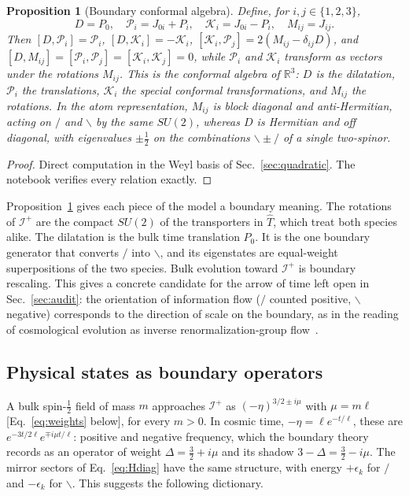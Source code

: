 \documentclass[reprint,aps,prd,amsmath,amssymb,superscriptaddress,nofootinbib,floatfix]{revtex4-2}
\theoremstyle{plain}
\newtheorem{proposition}{Proposition}
\theoremstyle{definition}
\theoremstyle{remark}
\newcommand{\Lat}{\ensuremath{/}}                 %
\newcommand{\Rat}{\ensuremath{\backslash}}        %
\newcommand{\Tc}{\hat{T}}
\newcommand{\SU}{SU(2)}
\begin{document}
\begin{proposition}[Boundary conformal algebra]
\label{prop:conformal}
Define, for $i,j\in\{1,2,3\}$,
\begin{equation}
D=P_0,\quad \mathcal{P}_i=J_{0i}+P_i,\quad \mathcal{K}_i=J_{0i}-P_i,\quad M_{ij}=J_{ij}.
\label{eq:confgen}
\end{equation}
Then $[D,\mathcal{P}_i]=\mathcal{P}_i$, $[D,\mathcal{K}_i]=-\mathcal{K}_i$, $[\mathcal{K}_i,\mathcal{P}_j]=2(M_{ij}-\delta_{ij}D)$, and
$[D,M_{ij}]=[\mathcal{P}_i,\mathcal{P}_j]=[\mathcal{K}_i,\mathcal{K}_j]=0$, while $\mathcal{P}_i$ and $\mathcal{K}_i$ transform as vectors under the
rotations $M_{ij}$. This is the conformal algebra of $\mathbb{R}^3$: $D$ is the dilatation, $\mathcal{P}_i$ the translations,
$\mathcal{K}_i$ the special conformal transformations, and $M_{ij}$ the rotations. In the atom representation, $M_{ij}$ is block
diagonal and anti-Hermitian, acting on $\Lat$ and $\Rat$ by the same $\SU$, whereas $D$ is Hermitian and off diagonal,
with eigenvalues $\pm\tfrac12$ on the combinations $\Rat\pm\Lat$ of a single two-spinor.
\end{proposition}
\begin{proof}
Direct computation in the Weyl basis of Sec.~\ref{sec:quadratic}. The notebook verifies every relation exactly.
\end{proof}

Proposition~\ref{prop:conformal} gives each piece of the model a boundary meaning. The rotations of $\mathcal{I}^+$ are the
compact $\SU$ of the transporters in $\Tc$, which treat both species alike. The dilatation is the bulk time
translation $P_0$. It is the one boundary generator that converts $\Lat$ into $\Rat$, and its eigenstates are equal-weight
superpositions of the two species. Bulk evolution toward $\mathcal{I}^+$ is boundary rescaling. This gives a concrete
candidate for the arrow of time left open in Sec.~\ref{sec:audit}: the orientation of information flow ($\Lat$ counted
positive, $\Rat$ negative) corresponds to the direction of scale on the boundary, as in the reading of cosmological
evolution as inverse renormalization-group flow~\cite{Strominger2001b}.

\subsection{Physical states as boundary operators}

A bulk spin-$\tfrac12$ field of mass $m$ approaches $\mathcal{I}^+$ as $(-\eta)^{3/2\pm i\mu}$ with $\mu=m\ell$ [Eq.~\eqref{eq:weights}
below], for every $m>0$. In cosmic time, $-\eta=\ell e^{-t/\ell}$, these are $e^{-3t/2\ell}e^{\mp i\mu t/\ell}$: positive and negative
frequency, which the boundary theory records as an operator of weight $\Delta=\tfrac32+i\mu$ and its shadow $3-\Delta=\tfrac32-i\mu$. The mirror sectors of
Eq.~\eqref{eq:Hdiag} have the same structure, with energy $+\epsilon_k$ for $\Lat$ and $-\epsilon_k$ for $\Rat$. This suggests the following
dictionary.
\end{document}
